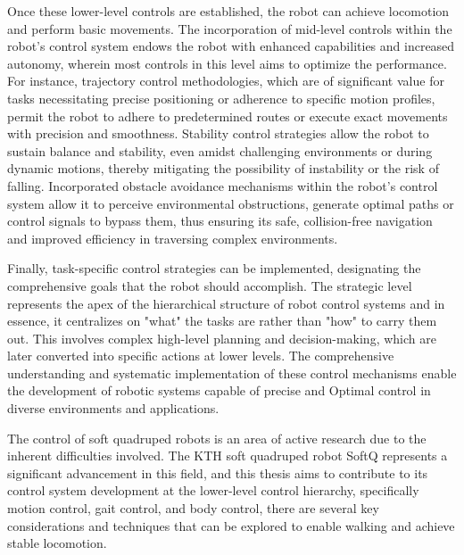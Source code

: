 Once these lower-level controls are established, the robot can achieve locomotion and perform basic movements. The incorporation of mid-level controls within the robot's control system endows the robot with enhanced capabilities and increased autonomy, wherein most controls in this level aims to optimize the performance. For instance, trajectory control methodologies, which are of significant value for tasks necessitating precise positioning or adherence to specific motion profiles, permit the robot to adhere to predetermined routes or execute exact movements with precision and smoothness\cite{leeTrajectoryDesignControl2017}. Stability control strategies allow the robot to sustain balance and stability, even amidst challenging environments or during dynamic motions, thereby mitigating the possibility of instability or the risk of falling\cite{sunBalanceControlQuadruped2022}. Incorporated obstacle avoidance mechanisms within the robot's control system allow it to perceive environmental obstructions, generate optimal paths or control signals to bypass them, thus ensuring its safe, collision-free navigation and improved efficiency in traversing complex environments\cite{liQuadrupedRobotObstacle2022}. 

Finally, task-specific control strategies can be implemented, designating the comprehensive goals that the robot should accomplish. The strategic level represents the apex of the hierarchical structure of robot control systems and in essence, it centralizes on "what" the tasks are rather than "how" to carry them out. This involves complex high-level planning and decision-making, which are later converted into specific actions at lower levels. The comprehensive understanding and systematic implementation of these control mechanisms enable the development of robotic systems capable of precise and Optimal control in diverse environments and applications. 

The control of soft quadruped robots is an area of active research due to the inherent difficulties involved. The KTH soft quadruped robot SoftQ represents a significant advancement in this field, and this thesis aims to contribute to its control system development at the lower-level control hierarchy, specifically motion control, gait control, and body control, there are several key considerations and techniques that can be explored to enable walking and achieve stable locomotion. 

